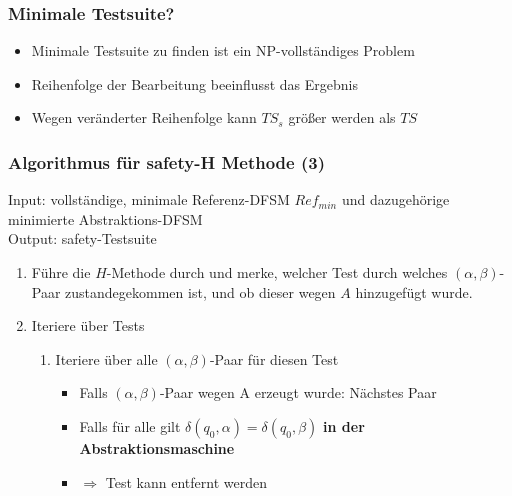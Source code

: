     \begin{frame}
    \frametitle{Minimale Testsuite?}
    \begin{itemize}
      \item Minimale Testsuite zu finden ist ein NP-vollständiges Problem
      \item Reihenfolge der Bearbeitung beeinflusst das Ergebnis
      \item Wegen veränderter Reihenfolge kann $TS_s$ größer werden als $TS$
    \end{itemize}
    \end{frame}
    
    \begin{frame}
    \frametitle{Algorithmus für safety-H Methode (3)}
    Input: vollständige, minimale Referenz-DFSM $Ref_{min}$ und dazugehörige minimierte Abstraktions-DFSM\\
    Output: safety-Testsuite
    \begin{enumerate}
      \item Führe die $H$-Methode durch und merke, welcher Test durch welches $(\alpha,\beta)$-Paar zustandegekommen ist, und ob dieser wegen $A$ hinzugefügt wurde.
      \item Iteriere über Tests
      \begin{enumerate}
        \item Iteriere über alle $(\alpha,\beta)$-Paar für diesen Test\\
        \begin{itemize}
          \item[] Falls $(\alpha,\beta)$-Paar wegen A erzeugt wurde: Nächstes Paar
          \item[] Falls für alle gilt $\delta(q_0,\alpha) = \delta(q_0,\beta)$ \textbf{in der Abstraktionsmaschine}
          \item[] $\Rightarrow$ Test kann entfernt werden
    
        \end{itemize}
      \end{enumerate}
    \end{enumerate}
    \end{frame}
    